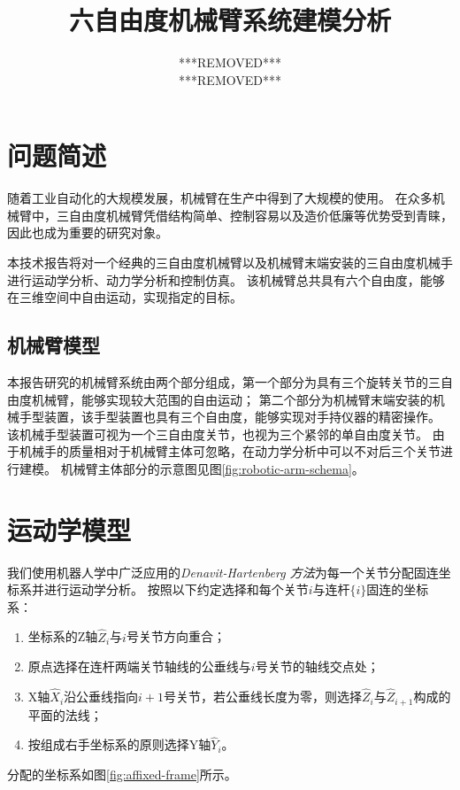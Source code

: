 \documentclass{ctexart}
\title{六自由度机械臂系统建模分析}
\author{***REMOVED*** \\ ***REMOVED***}
\begin{document}
\maketitle

\section{问题简述}

随着工业自动化的大规模发展，机械臂在生产中得到了大规模的使用。
在众多机械臂中，三自由度机械臂凭借结构简单、控制容易以及造价低廉等优势受到青睐，因此也成为重要的研究对象。

本技术报告将对一个经典的三自由度机械臂以及机械臂末端安装的三自由度机械手进行运动学分析、动力学分析和控制仿真。
该机械臂总共具有六个自由度，能够在三维空间中自由运动，实现指定的目标。

\subsection{机械臂模型}



本报告研究的机械臂系统由两个部分组成，第一个部分为具有三个旋转关节的三自由度机械臂，能够实现较大范围的自由运动；
第二个部分为机械臂末端安装的机械手型装置，该手型装置也具有三个自由度，能够实现对手持仪器的精密操作。
该机械手型装置可视为一个三自由度关节，也视为三个紧邻的单自由度关节。
由于机械手的质量相对于机械臂主体可忽略，在动力学分析中可以不对后三个关节进行建模。
机械臂主体部分的示意图见图\ref{fig:robotic-arm-schema}。

\section{运动学模型}

我们使用机器人学中广泛应用的\emph{Denavit-Hartenberg 方法}为每一个关节分配固连坐标系并进行运动学分析。
按照以下约定选择和每个关节$i$与连杆$\{i\}$固连的坐标系：
\begin{enumerate}
    \item 坐标系的Z轴$\hat Z_i$与$i$号关节方向重合；
    \item 原点选择在连杆两端关节轴线的公垂线与$i$号关节的轴线交点处；
    \item X轴$\hat X_i$沿公垂线指向$i+1$号关节，若公垂线长度为零，则选择$\hat Z_i$与$\hat Z_{i+1}$构成的平面的法线；
    \item 按组成右手坐标系的原则选择Y轴$\hat Y_i$。
\end{enumerate}
分配的坐标系如图\ref{fig:affixed-frame}所示。
\end{document}
